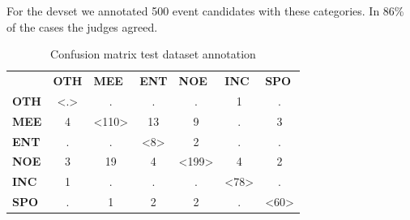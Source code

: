 \documentclass[
10pt, %
a4paper, %
oneside, %
headinclude,footinclude, %
BCOR5mm, %
]{scrartcl}
\begin{document}
For the devset we annotated 500 event candidates with these categories. In 86\% of the cases the judges agreed.

\begin{table}[h]
\caption[Confusion matrix devset annotation]{Confusion matrix test dataset annotation }
\begin{tabular}{lcccccc}
                                  & \multicolumn{1}{l}{\textbf{OTH}}            & \multicolumn{1}{l}{\textbf{MEE}}              & \multicolumn{1}{l}{\textbf{ENT}}            & \multicolumn{1}{l}{\textbf{NOE}}              & \multicolumn{1}{l}{\textbf{INC}}             & \multicolumn{1}{l}{\textbf{SPO}}    \\ \cline{2-7} 
\multicolumn{1}{l|}{\textbf{OTH}} & \multicolumn{1}{c|}{\textless.\textgreater} & \multicolumn{1}{c|}{.}                        & \multicolumn{1}{c|}{.}                      & \multicolumn{1}{c|}{.}                        & \multicolumn{1}{c|}{1}                       & \multicolumn{1}{c|}{.}              \\ \cline{2-7} 
\multicolumn{1}{l|}{\textbf{MEE}} & \multicolumn{1}{c|}{4}                      & \multicolumn{1}{c|}{\textless110\textgreater} & \multicolumn{1}{c|}{13}                     & \multicolumn{1}{c|}{9}                        & \multicolumn{1}{c|}{.}                       & \multicolumn{1}{c|}{3}              \\ \cline{2-7} 
\multicolumn{1}{l|}{\textbf{ENT}} & \multicolumn{1}{c|}{.}                      & \multicolumn{1}{c|}{.}                        & \multicolumn{1}{c|}{\textless8\textgreater} & \multicolumn{1}{c|}{2}                        & \multicolumn{1}{c|}{.}                       & \multicolumn{1}{c|}{.}              \\ \cline{2-7} 
\multicolumn{1}{l|}{\textbf{NOE}} & \multicolumn{1}{c|}{3}                      & \multicolumn{1}{c|}{19}                       & \multicolumn{1}{c|}{4}                      & \multicolumn{1}{c|}{\textless199\textgreater} & \multicolumn{1}{c|}{4}                       & \multicolumn{1}{c|}{2}              \\ \cline{2-7} 
\multicolumn{1}{l|}{\textbf{INC}} & \multicolumn{1}{c|}{1}                      & \multicolumn{1}{c|}{.}                        & \multicolumn{1}{c|}{.}                      & \multicolumn{1}{c|}{.}                        & \multicolumn{1}{c|}{\textless78\textgreater} & \multicolumn{1}{c|}{.}              \\ \cline{2-7} 
\multicolumn{1}{l|}{\textbf{SPO}} & \multicolumn{1}{c|}{.}                      & \multicolumn{1}{c|}{1}                        & \multicolumn{1}{c|}{2}                      & \multicolumn{1}{c|}{2}                        & \multicolumn{1}{c|}{.}                       & \multicolumn{1}{c|}{\textless60\textgreater} \\ \cline{2-7} 
\end{tabular}

\end{table}
\end{document}
